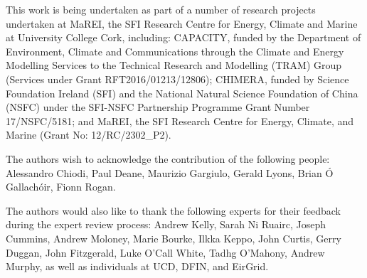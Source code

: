 \documentclass[gmd,manuscript]{copernicus}
\begin{document}


\begin{acknowledgements}
This work is being undertaken as part of a number of research projects undertaken at MaREI, the SFI Research Centre for Energy, Climate and Marine at University College Cork, including: CAPACITY, funded by the Department of Environment, Climate and Communications through the Climate and Energy Modelling Services to the Technical Research and Modelling (TRAM) Group (Services under Grant RFT2016/01213/12806); CHIMERA, funded by Science Foundation Ireland (SFI) and the National Natural Science Foundation of China (NSFC) under the SFI-NSFC Partnership Programme Grant Number 17/NSFC/5181; and MaREI, the SFI Research Centre for Energy, Climate, and Marine (Grant No: 12/RC/2302\_P2).

The authors wish to acknowledge the contribution of the following people: Alessandro Chiodi, Paul Deane, Maurizio Gargiulo, Gerald Lyons, Brian \'{O} Gallach\'{o}ir, Fionn Rogan.

The authors would also like to thank the following experts for their feedback during the expert review process: Andrew Kelly, Sarah Ni Ruairc, Joseph Cummins, Andrew Moloney, Marie Bourke, Ilkka Keppo, John Curtis, Gerry Duggan, John Fitzgerald, Luke O'Call White, Tadhg O'Mahony, Andrew Murphy, as well as individuals at UCD, DFIN, and EirGrid.
\end{acknowledgements}










\end{document}
